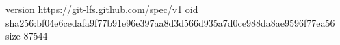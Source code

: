 version https://git-lfs.github.com/spec/v1
oid sha256:bf04e6cedafa9f77b91e96e397aa8d3d566d935a7d0ce988da8ae9596f77ea56
size 87544
